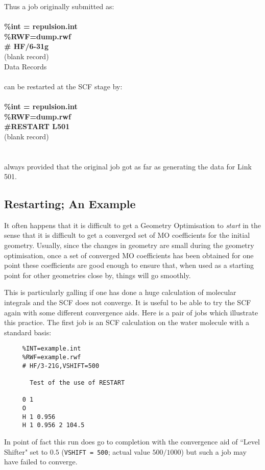 Thus a job originally submitted as: \\
\ \\
{\bf \%int = repulsion.int} \\
{\bf \%RWF=dump.rwf} \\
{\bf \# HF/6-31g} \\
(blank record) \\
Data Records \\
\ \\
can be restarted at the SCF stage by: \\
\ \\
{\bf \%int = repulsion.int} \\
{\bf \%RWF=dump.rwf} \\
{\bf \#RESTART L501} \\
(blank record) \\
\ \\
\ \\
always provided that the original job got as far as generating the
data for Link 501.
\subsection{\sf Restarting; An Example}
It often happens that it is difficult to get a Geometry Optimisation
to {\em start} in the sense that it is difficult to get a converged set
of MO coefficients for the initial geometry. Usually, since the 
changes in geometry are small during the geometry optimisation, once a set of
converged MO coefficients has been obtained for one point
these coefficients are good enough to ensure that, 
when used as a starting point for other geometries close by, things will
go smoothly. 

This is particularly galling if one has done a huge calculation of 
molecular integrals and the SCF does not converge. It is useful to be able
to try the SCF again with some different convergence aids. Here is a pair
of jobs which illustrate this practice.
\newpage
The first job is an SCF calculation on the water molecule 
with a standard basis:
\begin{verbatim}
     %INT=example.int
     %RWF=example.rwf
     # HF/3-21G,VSHIFT=500

       Test of the use of RESTART

     0 1
     O
     H 1 0.956
     H 1 0.956 2 104.5

\end{verbatim}
In point of fact this run does go to completion with the convergence
aid of ``Level Shifter" set to $0.5$ ({\tt VSHIFT = 500};
actual value $500/1000$) but such a job may have failed to converge.

